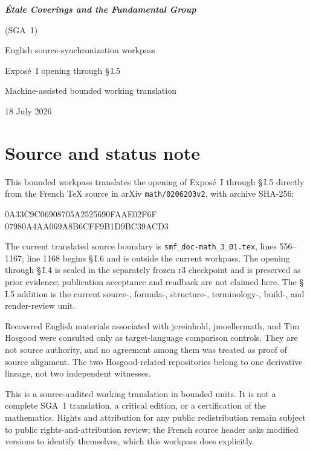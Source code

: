 \documentclass[11pt,oneside]{amsbook}
\begin{document}
\frontmatter
\begin{titlepage}
  \centering
  \vspace*{35mm}
  {\Huge\bfseries \textit{Étale Coverings and the Fundamental Group}\par}
  \vspace{3mm}
  {\LARGE (SGA~1)\par}
  \vspace{20mm}
  {\Large English source-synchronization workpass\par}
  \vspace{3mm}
  {\Large Exposé~I opening through \S\,I.5\par}
  \vfill
  {\large Machine-assisted bounded working translation\par}
  \vspace{5mm}
  {\large 18 July 2026\par}
\end{titlepage}

\chapter*{Source and status note}

This bounded workpass translates the opening of Exposé~I through \S\,I.5 directly
from the French \TeX{} source in arXiv \texttt{math/0206203v2}, with archive
SHA-256:
\begin{center}
  \small\ttfamily
  0A33C9C06908705A2525690FAAE02F6F\\
  07980A4AA069A8B6CFF9B1D9BC39ACD3
\end{center}
The current translated source boundary is
\texttt{smf\_doc-math\_3\_01.tex}, lines 556--1167; line 1168 begins \S\,I.6
and is outside the current workpass.  The opening through \S\,I.4 is sealed in
the separately frozen r3 checkpoint and is preserved as prior evidence;
publication acceptance and readback are not claimed here.  The \S\,I.5 addition
is the current source-, formula-, structure-, terminology-, build-, and
render-review unit.

Recovered English materials associated with jcreinhold, jmoellermath, and
Tim Hosgood were consulted only as target-language comparison controls.
They are not source authority, and no agreement among them was treated as
proof of source alignment.  The two Hosgood-related repositories belong to
one derivative lineage, not two independent witnesses.

This is a source-audited working translation in bounded units.  It is not
a complete SGA~1 translation, a critical edition, or a certification of the
mathematics.  Rights and attribution for any public redistribution remain
subject to public rights-and-attribution review; the French source header asks modified
versions to identify themselves, which this workpass does explicitly.
\end{document}

